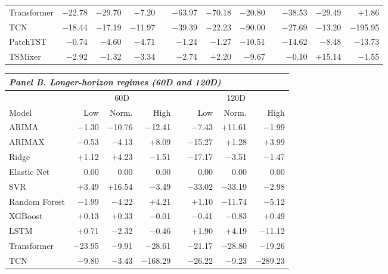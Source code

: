\documentclass[12pt,twoside]{ord}
\begin{document}
\begin{table}[htbp]
{\begin{tabular}{lrrr@{\hspace{3pt}}c@{\hspace{3pt}}rrr@{\hspace{3pt}}c@{\hspace{3pt}}rrr}
Transformer   & $-$22.78 & $-$29.70 & $-$7.20  & & $-$63.97 & $-$70.18 & $-$20.80 & & $-$38.53 & $-$29.49 & $+$1.86 \\
TCN           & $-$18.44 & $-$17.19 & $-$11.97 & & $-$39.39 & $-$22.23 & $-$90.00 & & $-$27.69 & $-$13.20 & $-$195.95 \\
PatchTST      & $-$0.74  & $-$4.60  & $-$4.71  & & $-$1.24  & $-$1.27  & $-$10.51 & & $-$14.62 & $-$8.48  & $-$13.73 \\
TSMixer       & $-$2.92  & $-$1.32  & $-$3.34  & & $-$2.74  & $+$2.20  & $-$9.67  & & $-$0.10  & $+$15.14 & $-$1.55 \\
\hline
\end{tabular}

\vspace{6pt}
\setlength{\tabcolsep}{5pt}
\begin{tabular}{lrrr@{\hspace{8pt}}c@{\hspace{8pt}}rrr}
\hline
\multicolumn{8}{l}{\textit{Panel B. Longer-horizon regimes (60D and 120D)}} \\
\hline
 & \multicolumn{3}{c}{60D} & & \multicolumn{3}{c}{120D} \\
\cline{2-4}\cline{6-8}
Model & Low & Norm. & High & & Low & Norm. & High \\
\hline
ARIMA         & $-$1.30  & $-$10.76 & $-$12.41  & & $-$7.43  & $+$11.61 & $-$1.99 \\
ARIMAX        & $-$0.53  & $-$4.13  & $+$8.09   & & $-$15.27 & $+$1.28  & $+$3.99 \\
Ridge         & $+$1.12  & $+$4.23  & $-$1.51   & & $-$17.17 & $-$3.51  & $-$1.47 \\
Elastic Net   & 0.00     & 0.00     & 0.00      & & 0.00     & 0.00     & 0.00 \\
SVR           & $+$3.49  & $+$16.54 & $-$3.49   & & $-$33.02 & $-$33.19 & $-$2.98 \\
Random Forest & $-$1.99  & $-$4.22  & $+$4.21   & & $+$1.10  & $-$11.74 & $-$5.12 \\
XGBoost       & $+$0.13  & $+$0.33  & $-$0.01   & & $-$0.41  & $-$0.83  & $+$0.49 \\
LSTM          & $+$0.71  & $-$2.32  & $-$0.46   & & $+$1.90  & $+$4.19  & $-$11.12 \\
Transformer   & $-$23.95 & $-$9.91  & $-$28.61  & & $-$21.17 & $-$28.80 & $-$19.26 \\
TCN           & $-$9.80  & $-$3.43  & $-$168.29 & & $-$26.22 & $-$9.23  & $-$289.23 \\

\end{tabular}}
\end{table}
\end{document}
